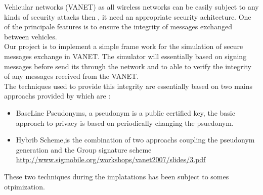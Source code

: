 Vehicular networks  (VANET) as all wireless networks can be easily subject to any kinds of security  attacks  then , it need an appropriate security achitecture. One of the principale features is to ensure the integrity of messages exchanged between vehicles.\\
Our project is to implement a simple frame work for the simulation of secure messages exchange in VANET. The simulator will essentially based on  signing  messages  before send its through the network and to able to verify  the integrity of any messages received from the VANET.\\
The techniques used to provide this integrity are essentially based on two mains approachs provided by\cite{calandriello} which are :
\begin{itemize}
\item BaseLine Pseudonyms, a pseudonym is a public certified key,
the basic approach to privacy is based on periodically changing the psuedonym.
\item Hybrib Scheme,is the combination of two approachs coupling the pseudonym generation and the Group signature scheme
\\
\url{http://www.sigmobile.org/workshops/vanet2007/slides/3.pdf}
\end{itemize}
These two techniques during the implatations has been subject to somes otpimization.
\\
\\